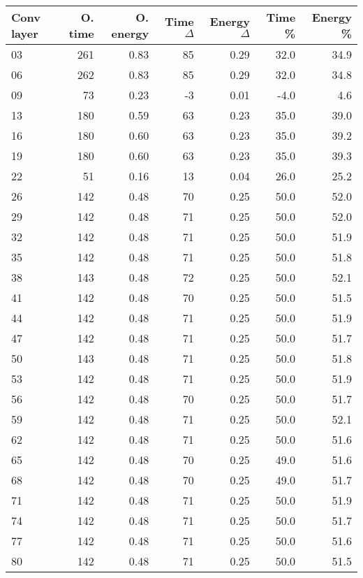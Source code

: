 \begin{table}
\centering
\begin{tabular}{|l|r|r|r|r|r|r|}
\hline
Conv layer & O. time & O. energy & Time $\Delta$ & Energy $\Delta$ & Time \% & Energy \% \\\hline
03 & 261 & 0.83 & 85 & 0.29 & 32.0 & 34.9 \\\hline
06 & 262 & 0.83 & 85 & 0.29 & 32.0 & 34.8 \\\hline
09 & 73 & 0.23 & -3 & 0.01 & -4.0 & 4.6 \\\hline
13 & 180 & 0.59 & 63 & 0.23 & 35.0 & 39.0 \\\hline
16 & 180 & 0.60 & 63 & 0.23 & 35.0 & 39.2 \\\hline
19 & 180 & 0.60 & 63 & 0.23 & 35.0 & 39.3 \\\hline
22 & 51 & 0.16 & 13 & 0.04 & 26.0 & 25.2 \\\hline
26 & 142 & 0.48 & 70 & 0.25 & 50.0 & 52.0 \\\hline
29 & 142 & 0.48 & 71 & 0.25 & 50.0 & 52.0 \\\hline
32 & 142 & 0.48 & 71 & 0.25 & 50.0 & 51.9 \\\hline
35 & 142 & 0.48 & 71 & 0.25 & 50.0 & 51.8 \\\hline
38 & 143 & 0.48 & 72 & 0.25 & 50.0 & 52.1 \\\hline
41 & 142 & 0.48 & 70 & 0.25 & 50.0 & 51.5 \\\hline
44 & 142 & 0.48 & 71 & 0.25 & 50.0 & 51.9 \\\hline
47 & 142 & 0.48 & 71 & 0.25 & 50.0 & 51.7 \\\hline
50 & 143 & 0.48 & 71 & 0.25 & 50.0 & 51.8 \\\hline
53 & 142 & 0.48 & 71 & 0.25 & 50.0 & 51.9 \\\hline
56 & 142 & 0.48 & 70 & 0.25 & 50.0 & 51.7 \\\hline
59 & 142 & 0.48 & 71 & 0.25 & 50.0 & 52.1 \\\hline
62 & 142 & 0.48 & 71 & 0.25 & 50.0 & 51.6 \\\hline
65 & 142 & 0.48 & 70 & 0.25 & 49.0 & 51.6 \\\hline
68 & 142 & 0.48 & 70 & 0.25 & 49.0 & 51.7 \\\hline
71 & 142 & 0.48 & 71 & 0.25 & 50.0 & 51.9 \\\hline
74 & 142 & 0.48 & 71 & 0.25 & 50.0 & 51.7 \\\hline
77 & 142 & 0.48 & 71 & 0.25 & 50.0 & 51.6 \\\hline
80 & 142 & 0.48 & 71 & 0.25 & 50.0 & 51.5 \\\hline

\end{tabular}
\end{table}
